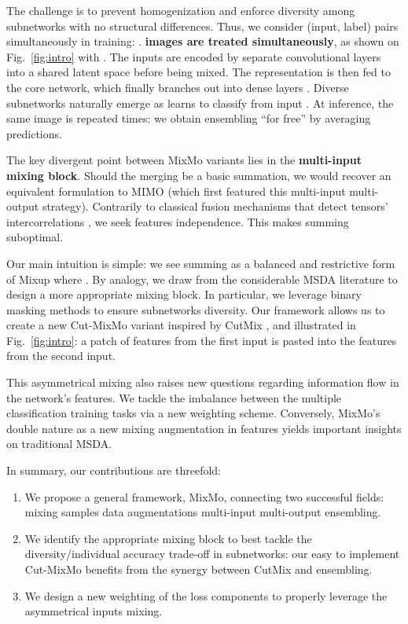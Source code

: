 \documentclass[10pt,twocolumn,letterpaper]{article}
\begin{document}
The challenge is to prevent homogenization and enforce diversity among
subnetworks with no structural differences. Thus, we consider  (input,
label) pairs simultaneously in training: . \textbf{ images are treated simultaneously}, as shown on Fig.~\ref{fig:intro} with . The  inputs are encoded by  separate convolutional layers  into a shared latent space before being mixed. The representation is
then fed to the core network, which finally branches out into  dense layers .
Diverse subnetworks naturally emerge as  learns to classify  from
input . At inference, the same image is repeated  times: we obtain
ensembling ``for free'' by averaging  predictions.


The key divergent point between MixMo variants lies in the \textbf{multi-input
mixing block}.
Should the merging be a basic summation, we would recover an equivalent
formulation to MIMO \cite{havasi2020raining} (which first featured this multi-input
multi-output strategy).
Contrarily to classical fusion mechanisms that detect tensors' intercorrelations
\cite{ben2017mutan,cadene2019murel}, we seek features independence. This makes
summing suboptimal.

Our main intuition is simple: we see summing as a balanced and restrictive form
of Mixup \cite{zhang2018mixup} where . By analogy,
we draw from the considerable MSDA literature to design a more
appropriate mixing block. In particular, we leverage binary masking methods to
ensure subnetworks diversity. Our framework allows us to create a
new Cut-MixMo variant inspired by CutMix \cite{yun2019cutmix}, and illustrated in
Fig.~\ref{fig:intro}: a patch of features from the first input is pasted into
the features from the second input.


This asymmetrical mixing also raises new questions regarding information flow in
the network's features. We tackle the imbalance between the multiple
classification training tasks via a new weighting scheme.
Conversely, MixMo's double nature as a
new mixing augmentation in features yields important insights on traditional MSDA.

In summary, our contributions are threefold:\begin{enumerate}
\item We propose a general framework, MixMo, connecting two successful fields:
mixing samples data augmentations  multi-input multi-output ensembling.
\item We identify the appropriate mixing block to best tackle
  the diversity/individual accuracy trade-off in subnetworks: our easy to implement Cut-MixMo benefits from the synergy between CutMix and ensembling.\item We design a new weighting of the loss components to properly leverage the asymmetrical inputs mixing.
\end{enumerate}
\end{document}
